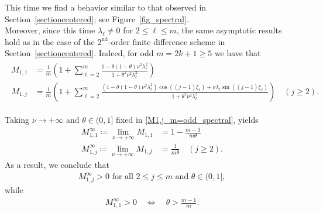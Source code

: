 \documentclass[a4paper]{article}
\newcommand{\te}{\theta}
\begin{document}
\begin{description}[style=unboxed,leftmargin=0cm]
\item [{Case 2:} $m$ is {odd}.]
This time we find a behavior similar to that observed in Section~\ref{sectioncentered}; see
Figure~\ref{fig_spectral}. \\
Moreover, since this time $\lambda_\ell\ne 0$ for $2\le\ell\le m$, the same asymptotic results hold as in the case of the
$2^\text{nd}$-order finite difference scheme in Section~\ref{sectioncentered}. Indeed, 
for odd $m = 2k+1 \ge 5$ we have that
\begin{align}\label{M1,j_m=odd_spectral}
	\begin{split}
		M_{1,1} & = \frac{1}{m} \left(1 + \sum_{\ell=2}^{m} \frac{1-\theta(1-\theta)\nu^2\lambda^2_\ell}
			{1+\theta^2\nu^2\lambda^2_\ell}\right) \\
		M_{1,j} & = \frac{1}{m} \left(1 + \sum_{\ell=2}^{m} \frac{(1-\theta(1-\theta)\nu^2\lambda^2_\ell)
			\cos((j-1)\xi_\ell) + \nu \lambda_\ell\sin((j-1)\xi_\ell)}{1+\theta^2\nu^2\lambda^2_\ell}
			\right) \quad (j\ge 2).
	\end{split}
\end{align}

Taking $\nu \to +\infty$ and $\te \in (0,1]$ fixed in \eqref{M1,j_m=odd_spectral}, yields
\begin{align*}
    M_{1,1}^\infty \coloneqq \lim_{\nu \to +\infty} M_{1,1} & =  1-\frac{m-1}{m\theta} \\
    M_{1,j}^\infty \coloneqq \lim_{\nu \to +\infty} M_{1,j} & = \frac{1}{m\theta} \quad (j \ge 2).
\end{align*}
As a result, %
we conclude that
\begin{align*}
	M_{1,j}^\infty > 0 \text{ for all } 2\le j\le m \text{ and } \te \in (0,1],
\end{align*}
while
\begin{align*}
	M_{1,1}^\infty > 0 \quad\Longleftrightarrow \quad \theta > \frac{m-1}{m}.
\end{align*}
\end{description}
\end{document}
